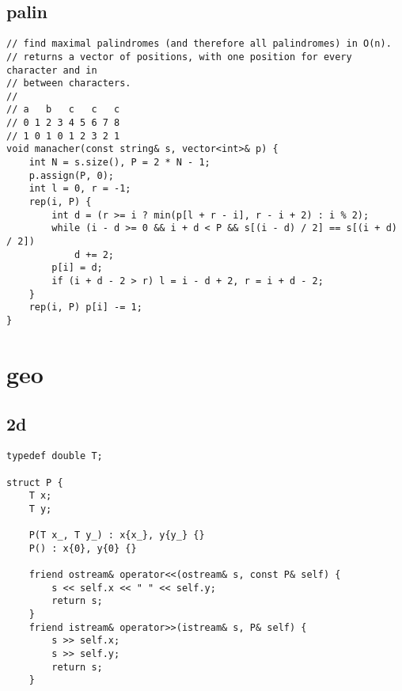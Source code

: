 \documentclass[twoside]{article}
\begin{document}
\begin{multicols*}{2}
{\subsection*{palin}
}
\begin{verbatim}
// find maximal palindromes (and therefore all palindromes) in O(n).
// returns a vector of positions, with one position for every character and in
// between characters.
//
// a   b   c   c   c
// 0 1 2 3 4 5 6 7 8
// 1 0 1 0 1 2 3 2 1
void manacher(const string& s, vector<int>& p) {
    int N = s.size(), P = 2 * N - 1;
    p.assign(P, 0);
    int l = 0, r = -1;
    rep(i, P) {
        int d = (r >= i ? min(p[l + r - i], r - i + 2) : i % 2);
        while (i - d >= 0 && i + d < P && s[(i - d) / 2] == s[(i + d) / 2])
            d += 2;
        p[i] = d;
        if (i + d - 2 > r) l = i - d + 2, r = i + d - 2;
    }
    rep(i, P) p[i] -= 1;
}
\end{verbatim}

{
[\vspace{2em}]
\section*{geo}
}
{
\subsection*{2d}
}
\begin{verbatim}
typedef double T;

struct P {
    T x;
    T y;

    P(T x_, T y_) : x{x_}, y{y_} {}
    P() : x{0}, y{0} {}

    friend ostream& operator<<(ostream& s, const P& self) {
        s << self.x << " " << self.y;
        return s;
    }
    friend istream& operator>>(istream& s, P& self) {
        s >> self.x;
        s >> self.y;
        return s;
    }


\end{verbatim}
\end{multicols*}
\end{document}
